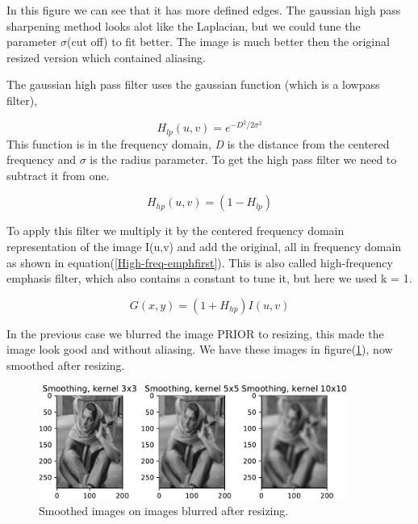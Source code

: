 {In this figure we can see that it has more defined edges. The gaussian high pass sharpening method looks alot like the Laplacian, but we could tune the parameter $\sigma$(cut off) to fit better. The image is much better then the original resized version which contained aliasing.

The gaussian high pass filter uses the gaussian function (which is a lowpass filter),

\begin{equation}
    H_{lp}(u,v) = e^{-D^2/2\sigma^2}
    \label{gausslowp}
\end{equation}
This function is in the frequency domain, \emph{D} is the distance from the centered frequency and $\sigma$ is the radius parameter. To get the high pass filter we need to subtract it from one.

\begin{equation}
    H_{hp}(u,v) = (1 - H_{lp})
    \label{gausshighp}
\end{equation}

To apply this filter we multiply it by the centered frequency domain representation of the image I(u,v) and add the original, all in frequency domain as shown in equation(\ref{High-freq-emphfirst}). This is also called high-frequency emphasis filter, which also contains a constant to tune it, but here we used k = 1.

\begin{equation}
    G(x,y) =  (1 + H_{hp})I(u,v)
    \label{High-freq-emphfirst}
\end{equation}


In the previous case we blurred the image PRIOR to resizing, this made the image look good and without aliasing. We have these images in figure(\ref{smooth2}), now smoothed after resizing.

\begin{figure}[!htb]
    {\centering
        \includegraphics[width=0.90\textwidth]{smoothafter.pdf}
        \caption{Smoothed images on images blurred after resizing.}
        \label{smooth2}
    \par}
    \end{figure}

}
